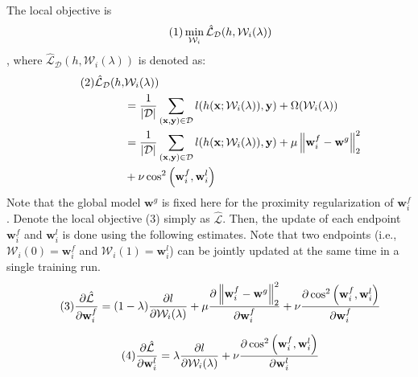 \documentclass[sigconf]{acmart}
\newcommand\numberthis{\addtocounter{equation}{1}\tag{\theequation}}
\begin{document}
\medskip
\noindent
The local objective is
\begin{align*}\numberthis
\min_{\mathcal{W}_i}\hat{\mathcal{L}}_{\mathcal{D}}(h, \mathcal{W}_i(\lambda))
\end{align*}
, where $\hat{\mathcal{L}}_{\mathcal{D}}(h, \mathcal{W}_i(\lambda))$ is denoted as:
\begin{align*}\numberthis
\hat{\mathcal{L}}_{\mathcal{D}}(h, &\mathcal{W}_i(\lambda)) \\
&=\frac{1}{\vert\mathcal{D}\vert}\sum_{(\mathbf{x}, \mathbf{y})\in\mathcal{D}} l(h(\mathbf{x};\mathcal{W}_i(\lambda)),\mathbf{y})+\Omega(\mathcal{W}_i(\lambda)) \\
&=\frac{1}{\vert\mathcal{D}\vert}\sum_{(\mathbf{x}, \mathbf{y})\in\mathcal{D}}l(h(\mathbf{x};\mathcal{W}_i(\lambda)),\mathbf{y}) +\mu\left\Vert\mathbf{w}^{f}_{i}-\mathbf{w}^g\right\Vert_2^2 \\
&+\nu\cos ^{2}\left(\mathbf{w}^{f}_{i}, \mathbf{w}^{l}_{i}\right)
\end{align*}
Note that the global model $\mathbf{w}^g$ is fixed here for the proximity regularization of $\mathbf{w}^{f}_{i}$. 
Denote the local objective (3) simply as $\hat{\mathcal{L}}$. Then, the update of each endpoint $\mathbf{w}^{f}_{i}$ and $\mathbf{w}^{l}_{i}$ is done using the following estimates. Note that two endpoints (i.e., $\mathcal{W}_i(0)=\mathbf{w}^{f}_{i}$ and $\mathcal{W}_i(1)=\mathbf{w}^{l}_{i}$) can be jointly updated at the same time in a single training run. 
\begin{align*}\numberthis
\frac{\partial \hat{\mathcal{L}}}{\partial \mathbf{w}^{f}_{i}}=(1-\lambda)\frac{\partial l}{\partial \mathcal{W}_i(\lambda)}+\mu\frac{\partial \left\Vert\mathbf{w}^{f}_{i}-\mathbf{w}^g\right\Vert_2^2}{\partial \mathbf{w}^{f}_{i}}+\nu \frac{\partial \cos ^{2}\left(\mathbf{w}^{f}_{i}, \mathbf{w}^{l}_{i}\right)}{\partial \mathbf{w}^{f}_{i}}
\end{align*}

\begin{align*}\numberthis
\frac{\partial \hat{\mathcal{L}}}{\partial \mathbf{w}^{l}_{i}}=\lambda\frac{\partial l}{\partial \mathcal{W}_i(\lambda)}+\nu \frac{\partial \cos ^{2}\left(\mathbf{w}^{f}_{i}, \mathbf{w}^{l}_{i}\right)}{\partial \mathbf{w}^{l}_{i}}
\end{align*}
\end{document}
